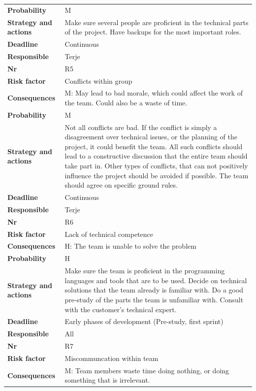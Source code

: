 \begin{longtable}{l p{9cm}}
\textbf{Probability} & M \\ 
\textbf{Strategy and actions} & Make sure several people are proficient in the technical parts of the project. Have backups for the most important roles. \\
\textbf{Deadline} & Continuous \\
\textbf{Responsible} & Terje \\
\hline
\textbf{Nr} & R5 \\
\textbf{Risk factor} & Conflicts within group \\
\textbf{Consequences} & M: May lead to bad morale, which could affect the work of the team. Could also be a waste of time. \\
\textbf{Probability} & M \\ 
\textbf{Strategy and actions} & Not all conflicts are bad. If the conflict is simply a disagreement over technical issues, or the planning of the project, it could benefit the team. All such conflicts should lead to a constructive discussion that the entire team should take part in. Other types of conflicts, that can not positively influence the project should be avoided if possible. The team should agree on specific ground rules. \\
\textbf{Deadline} & Continuous \\
\textbf{Responsible} & Terje \\
\hline
\textbf{Nr} & R6 \\
\textbf{Risk factor} & Lack of technical competence \\
\textbf{Consequences} & H: The team is unable to solve the problem  \\
\textbf{Probability} & H \\ 
\textbf{Strategy and actions} & Make sure the team is proficient in the programming languages and tools that are to be used. Decide on technical solutions that the team already is familiar with. Do a good pre-study of the parts the team is unfamiliar with. Consult with the customer’s technical expert. \\
\textbf{Deadline} & Early phases of development (Pre-study, first sprint) \\
\textbf{Responsible} & All \\
\hline
\textbf{Nr} & R7 \\
\textbf{Risk factor} & Miscommuncation within team \\
\textbf{Consequences} & M: Team members waste time doing nothing, or doing something that is irrelevant. \\

\end{longtable}
